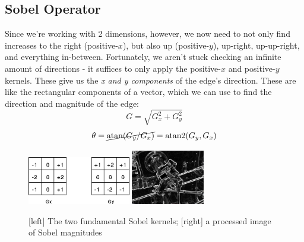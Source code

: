 \documentclass{article}
\begin{document}
\subsection{Sobel Operator}
Since we're working with 2 dimensions, however, we now need to not only find increases to the right (positive-$x$), but also up (positive-$y$), up-right, up-up-right, and everything in-between. Fortunately, we aren't stuck checking an infinite amount of directions - it suffices to only apply the positive-$x$ and positive-$y$ kernels. These give us the \textit{x and y components} of the edge's direction. These are like the rectangular components of a vector, which we can use to find the direction and magnitude of the edge:
\[G = \sqrt {G_x^2 + G_y^2}\]
\[\theta = \cancel{ \operatorname{atan}(G_y / G_x) } = \operatorname{atan2}(G_y, G_x)\]
\begin{figure}[!htb]
    \begin{center}
        \includegraphics[width=0.4\textwidth]{sobelkernel.png}
        \hspace{20pt}
        \includegraphics[width=0.285\textwidth]{outlines.PNG}
    \end{center}
    \vspace{-10pt}
    \caption{[left] The two fundamental Sobel kernels; [right] a processed image of Sobel magnitudes}
\end{figure}
\end{document}
